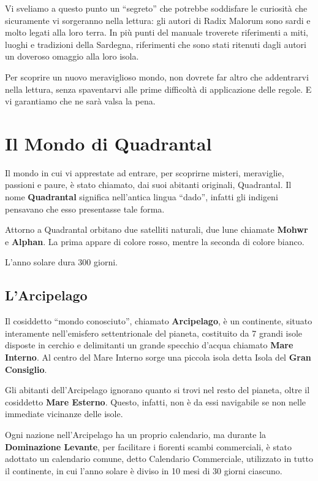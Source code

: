 Vi sveliamo a questo punto un ``segreto'' che potrebbe soddisfare le
curiosit\`a che sicuramente vi sorgeranno nella lettura: gli autori di
Radix Malorum sono sardi e molto legati alla loro terra. In pi\`u
punti del manuale troverete riferimenti a miti, luoghi e tradizioni
della Sardegna, riferimenti che sono stati ritenuti dagli autori un
doveroso omaggio alla loro isola.

Per scoprire un nuovo meraviglioso mondo, non dovrete far altro che
addentrarvi nella lettura, senza spaventarvi alle prime difficolt\`a
di applicazione delle regole. E vi garantiamo che ne sar\`a valsa la
pena.

{\sloppypar\raggedright \section{Il Mondo di Quadrantal}}
Il mondo in cui vi apprestate ad entrare, per scoprirne misteri,
meraviglie, passioni e paure, \`e stato chiamato, dai suoi abitanti
originali, Quadrantal.  Il nome \textbf{Quadrantal} significa nell'antica
lingua ``dado'', infatti gli indigeni pensavano che esso presentasse
tale forma.

\iffullversion
Attorno a Quadrantal orbitano due satelliti naturali, due lune
chiamate \textbf{Mohwr} e \textbf{Alphan}. La prima appare di colore
rosso, mentre la seconda di colore bianco.

L'anno solare dura 300 giorni. 
\fi

\subsection{L'Arcipelago}

Il cosiddetto ``mondo conosciuto'', chiamato \textbf{Arcipelago},
\`e un continente, situato interamente nell'emisfero settentrionale
del pianeta, costituito da 7 grandi isole disposte in cerchio e
delimitanti un grande specchio d'acqua chiamato \textbf{Mare Interno}.
Al centro del Mare Interno sorge una piccola isola detta Isola del
\textbf{Gran Consiglio}.

Gli abitanti dell'Arcipelago ignorano quanto si trovi nel resto del
pianeta, oltre il cosiddetto \textbf{Mare Esterno}. Questo, infatti,
non \`e da essi navigabile se non nelle immediate vicinanze delle
isole. 

Ogni nazione nell'Arcipelago ha un proprio calendario, ma durante la
\textbf{Dominazione Levante}, per facilitare i fiorenti scambi
commerciali, \`e stato adottato un calendario comune, detto Calendario
Commerciale, utilizzato in tutto il continente, in cui l'anno solare
\`e diviso in 10 mesi di 30 giorni ciascuno.

